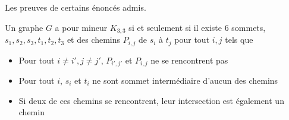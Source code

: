 \documentclass{scrartcl}
\begin{document}
\begin{flushleft}
Les preuves de certains énoncés admis.

\begin{lem*}[\ref{CNSK33}]
    Un graphe $G$ a pour mineur $K_{3,3}$ si et seulement si il existe $6$ sommets, $s_1, s_2, s_3, t_1, t_2, t_3$ et des chemins
    $P_{i,j}$ de $s_i$ à $t_j$ pour tout $i, j$ tels que
    \begin{itemize}
        \item Pour tout $i \neq i', j \neq j'$, $P_{i',j'}$ et $P_{i, j}$ ne se rencontrent pas
        \item Pour tout $i$, $s_i$ et $t_i$ ne sont sommet intermédiaire d'aucun des chemins
        \item Si deux de ces chemins se rencontrent, leur intersection est également un chemin
    \end{itemize}
\end{lem*}


\end{flushleft}
\end{document}
